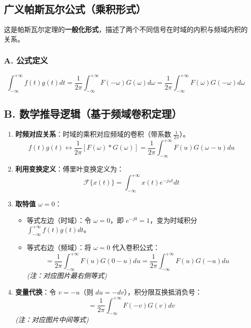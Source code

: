 \subsection{ 广义帕斯瓦尔公式（乘积形式）}

这是帕斯瓦尔定理的\textbf{一般化形式}，描述了两个不同信号在时域的内积与频域内积的关系。

\subsubsection*{A. 公式定义}
\begin{equation*}
    \int_{-\infty}^{+\infty} f(t)g(t)dt = \frac{1}{2\pi}\int_{-\infty}^{+\infty} F(-\omega)G(\omega)d\omega = \frac{1}{2\pi}\int_{-\infty}^{+\infty} F(\omega)G(-\omega)d\omega
\end{equation*}

\subsection*{B. 数学推导逻辑（基于频域卷积定理）}

\begin{enumerate}
    \item \textbf{时频对应关系}：时域的乘积对应频域的卷积（带系数 $\frac{1}{2\pi}$）。
    \begin{equation*}
        f(t)g(t) \longleftrightarrow \frac{1}{2\pi} [F(\omega) * G(\omega)] = \frac{1}{2\pi} \int_{-\infty}^{+\infty} F(u)G(\omega-u) du
    \end{equation*}
    
    \item \textbf{利用变换定义}：傅里叶变换定义为：
    \begin{equation*}
        \mathcal{F}\{x(t)\} = \int_{-\infty}^{+\infty} x(t)e^{-j\omega t} dt
    \end{equation*}
    
    \item \textbf{取特值 $\omega = 0$}：
    \begin{itemize}
        \item 等式左边（时域）：令 $\omega=0$，即 $e^{-j0}=1$，变为时域积分 $\int_{-\infty}^{+\infty} f(t)g(t) dt$。
        
\item 等式右边（频域）：将 $\omega=0$ 代入卷积公式：
        \begin{equation*}
            = \frac{1}{2\pi} \int_{-\infty}^{+\infty} F(u)G(0-u) du = \frac{1}{2\pi} \int_{-\infty}^{+\infty} F(u)G(-u) du
        \end{equation*}
        \textit{(注：对应图片最右侧等式)}
    \end{itemize}
    
    \item \textbf{变量代换}：令 $v = -u$（则 $du = -dv$），积分限互换抵消负号：
    \begin{equation*}
        = \frac{1}{2\pi} \int_{-\infty}^{+\infty} F(-v)G(v) dv
    \end{equation*}
    \textit{(注：对应图片中间等式)}
\end{enumerate}

